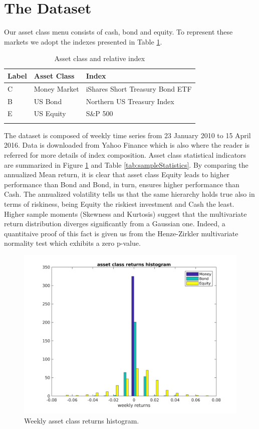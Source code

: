 \section{The Dataset}\label{sec:The_Dataset}
Our asset class menu consists of cash, bond and equity. To represent these markets we adopt the indexes presented in Table \ref{tab:indexes}.
\begin{table}[]
	\centering
	\begin{tabular}{@{}lll@{}} \toprule
		Label & Asset Class & Index\\ \midrule
		C & Money Market & iShares Short Treasury Bond ETF\\
		\addlinespace[0.5em]
		B & US Bond  & Northern US Treasury Index \\
		\addlinespace[0.5em]
	    E &	US Equity &  {S\&P 500}\\ \bottomrule
		\addlinespace[0.5em]
	\end{tabular}
	\caption{Asset class and relative index}
	\label{tab:indexes}
\end{table}
The dataset is composed of weekly time series from 23 January 2010 to 15 April 2016. Data is downloaded from Yahoo Finance which is also where the reader is referred for more details of index composition. Asset class statistical indicators are summarized in Figure \ref{fig:assetclassReturns} and Table \ref{tab:sampleStatistics}. By comparing the annualized Mean return, it is clear that asset class Equity leads to higher performance than Bond and Bond, in turn, ensures higher performance than Cash. The annualized volatility tells us that the same hierarchy holds true also in terms of riskiness, being Equity the riskiest investment and Cash the least. Higher sample moments (Skewness and Kurtosis) suggest that the multivariate return distribution diverges significantly from a Gaussian one. Indeed, a quantitaive proof of this fact is given us from the Henze-Zirkler multivariate normality test which exhibits a zero p-value. 
\begin{figure}[h]\label{fig:assetclassReturns}
	\centering
	\includegraphics[scale=0.6]{Images/ReturnsHist.png}
	\caption{Weekly asset class returns histogram.}
\end{figure}
